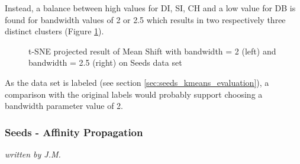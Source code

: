 Instead, a balance between high values for \gls{DI}, \gls{SI}, \gls{CH} and a low value for \gls{DB} is found for bandwidth values of 2 or 2.5 which results in two respectively three distinct clusters (Figure \ref{fig:meanshift_seeds_2_tsne}). 
\begin{figure}[H]
    \caption{t-SNE projected result of Mean Shift with bandwidth = 2 (left) and bandwidth = 2.5 (right) on Seeds data set}
    \label{fig:meanshift_seeds_2_tsne}
\end{figure}

As the data set is labeled (see section \ref{sec:seeds_kmeans_evaluation}), a comparison with the original labels would probably support choosing a bandwidth parameter value of 2.

\subsubsection{Seeds - Affinity Propagation}
\textit{written by J.M.}\\

